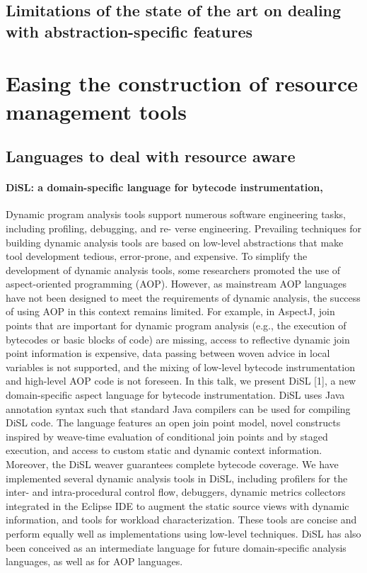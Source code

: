 \subsection{Limitations of the state of the art on dealing with abstraction-specific features}


\section{Easing the construction of resource management tools}

\subsection{Languages to deal with resource aware}

\paragraph{DiSL: a domain-specific language for bytecode instrumentation, \cite{Marek:2012:DEL:2162037.2162046,Marek2012}}
Dynamic program analysis tools support numerous software engineering tasks, including profiling, debugging, and re-
verse engineering.
Prevailing techniques for building dynamic analysis tools are based on low-level abstractions
that make tool development tedious, error-prone, and expensive. To simplify the development of dynamic analysis tools,
some researchers promoted the use of aspect-oriented programming (AOP). However, as mainstream AOP languages
have not been designed to meet the requirements of dynamic analysis, the success of using AOP in this context remains
limited. For example, in AspectJ, join points that are important for dynamic program analysis (e.g., the execution of
bytecodes or basic blocks of code) are missing, access to reflective dynamic join point information is expensive, data
passing between woven advice in local variables is not supported, and the mixing of low-level bytecode instrumentation
and high-level AOP code is not foreseen. In this talk, we present DiSL [1], a new domain-specific aspect language for
bytecode instrumentation.
DiSL uses Java annotation syntax such that standard Java compilers can be used for compiling
DiSL code. The language features an open join point model, novel constructs inspired by weave-time evaluation of
conditional join points and by staged execution, and access to custom static and dynamic context information.
Moreover, the DiSL weaver guarantees complete bytecode coverage.
We have implemented several dynamic analysis tools in DiSL,
including profilers for the inter- and intra-procedural control
flow, debuggers, dynamic metrics collectors integrated in the
Eclipse IDE to augment the static source views with dynamic information, and tools for workload characterization.
These tools are concise and perform equally well as implementations using low-level techniques. DiSL has also been
conceived as an intermediate language for future domain-specific analysis languages, as well as for AOP languages.

